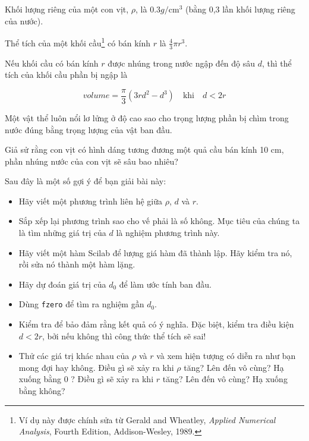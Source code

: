 \documentclass[12pt]{book}
\begin{document}
\begin{ex}
\label{duck}

Khối lượng riêng của một con vịt, $\rho$, là $0.3 g / \mathrm{cm}^3$ (bằng 0,3 
lần khối lượng riêng của nước).

Thể tích của một khối cầu\footnote{Ví dụ này được chính sửa từ Gerald
and Wheatley, {\em Applied Numerical Analysis}, Fourth Edition,
Addison-Wesley, 1989.} có bán kính $r$ là $\frac{4}{3} \pi r^3$.

Nếu khối cầu có bán kính $r$ được nhúng trong nước ngập đến độ sâu $d$, 
thì thể tích của khối cầu phần bị ngập là

\[ volume = \frac{\pi}{3} (3r d^2 - d^3) \quad 
\mbox{khi} \quad d < 2 r \]

Một vật thể luôn nổi lơ lửng ở độ cao sao cho trọng lượng phần bị chìm 
trong nước đúng bằng trọng lượng của vật ban đầu.

Giả sử rằng con vịt có hình dáng tương đương một quả cầu bán kính 10 cm,
phần nhúng nước của con vịt sẽ sâu bao nhiêu?

Sau đây là một số gợi ý để bạn giải bài này:

\begin{itemize}

\item Hãy viết một phương trình liên hệ giữa $\rho$, $d$ và $r$.

\item Sắp xếp lại phương trình sao cho vế phải là số không.
Mục tiêu của chúng ta là tìm những giá trị của $d$ là nghiệm phương trình này.

\item Hãy viết một hàm Scilab để lượng giá hàm đã thành lập. Hãy kiểm tra
   nó, rồi sửa nó thành một hàm lặng.

\item Hãy dự đoán giá trị của $d_0$ để làm ước tính ban đầu.

\item Dùng {\tt fzero} để tìm ra nghiệm gần $d_0$.

\item Kiểm tra để bảo đảm rằng kết quả có ý nghĩa. Đặc biệt, kiểm tra
   điều kiện $d < 2 r$, bởi nếu không thì công thức thể tích sẽ sai!

\item Thử các giá trị khác nhau của $\rho$ và $r$ và xem hiện tượng có diễn ra
như bạn mong đợi hay không. Điều gì sẽ xảy ra khi $\rho$ tăng? Lên đến
vô cùng? Hạ xuống bằng 0 ? Điều gì sẽ xảy ra khi $r$ tăng?  Lên đến vô cùng?
Hạ xuống bằng không?

\end{itemize}


\end{ex}
\end{document}
